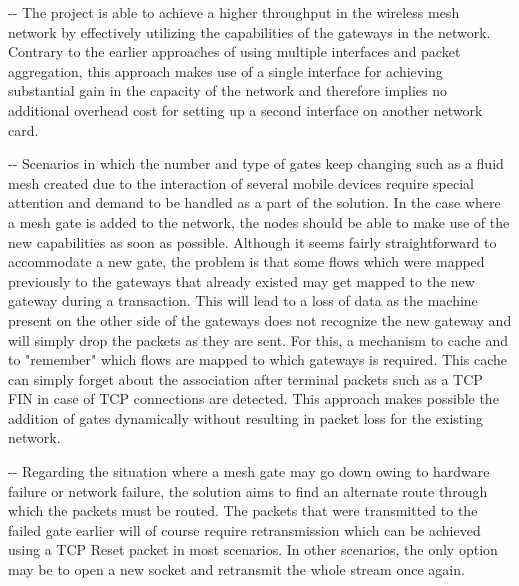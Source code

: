 \documentclass[12pt]{article}
\makeatletter
\newenvironment{indentation}[3]%
	{\par\setlength{\parindent}{#3}
	\setlength{\leftmargin}{#1}       \setlength{\rightmargin}{#1}%
	\advance\linewidth -\leftmargin       \advance\linewidth -\rightmargin%
	\advance\@totalleftmargin\leftmargin  \@setpar{{\@@par}}%
	\parshape 1\@totalleftmargin \linewidth\ignorespaces}{\par}%
\makeatother
\begin{document}
\begin{indentation}{0pt}{0pt}{0pt}
{\normalsize \hspace{1cm} The project is able to achieve a higher throughput in the wireless mesh network by effectively utilizing the capabilities of the gateways in the network. Contrary to the earlier approaches of using multiple interfaces and packet aggregation, this approach makes use of a single interface for achieving substantial gain in the capacity of the network and therefore implies no additional overhead cost for setting up a second interface on another network card.}
\end{indentation}
\pagebreak
\begin{indentation}{0pt}{0pt}{0pt}
{\normalsize \hspace{1cm} Scenarios in which the number and type of gates keep changing such as a fluid mesh created due to the interaction of several mobile devices require special attention and demand to be handled as a part of the solution. In the case where a mesh gate is added to the network, the nodes should be able to make use of the new capabilities as soon as possible. Although it seems fairly straightforward to accommodate a new gate, the problem is that some flows which were mapped previously to the gateways that already existed may get mapped to the new gateway during a transaction. This will lead to a loss of data as the machine present on the other side of the gateways does not recognize the new gateway and will simply drop the packets as they are sent. For this, a mechanism to cache and to "remember" which flows are mapped to which gateways is required. This cache can simply forget about the association after terminal packets such as a TCP FIN in case of TCP connections are detected. This approach makes possible the addition of gates dynamically without resulting in packet loss for the existing network.}
\end{indentation}

\begin{indentation}{0pt}{0pt}{0pt}
{\normalsize \hspace{1cm} Regarding the situation where a mesh gate may go down owing to hardware failure or network failure, the solution aims to find an alternate route through which the packets must be routed. The packets that were transmitted to the failed gate earlier will of course require retransmission which can be achieved using a TCP Reset packet in most scenarios. In other scenarios, the only option may be to open a new socket and retransmit the whole stream once again.}
\end{indentation}
\end{document}

